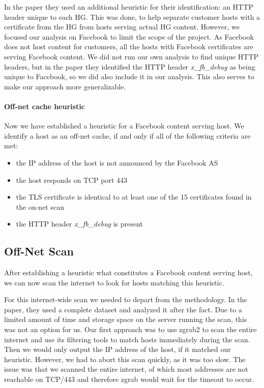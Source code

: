 \documentclass[sigconf,10pt,nonacm]{acmart}
\begin{document}
In the paper they used an additional heuristic for their identification: an HTTP header unique to each HG. This was done, to help separate customer hosts with a certificate from the HG from hosts serving actual HG content. However, we focused our analysis on Facebook to limit the scope of the project. As Facebook does not host content for customers, all the hosts with Facebook certificates are serving Facebook content. We did not run our own analysis to find unique HTTP headers, but in the paper they identified the HTTP header \textit{x\_fb\_debug} as being unique to Facebook, so we did also include it in our analysis. This also serves to make our approach more generalizable.

\paragraph{Off-net cache heuristic}
Now we have established a heuristic for a Facebook content serving host. We identify a host as an off-net cache, if and only if all of the following criteria are met:
\begin{itemize}
    \item the IP address of the host is not announced by the Facebook AS
    \item the host responds on TCP port 443
    \item the TLS certificate is identical to at least one of the 15 certificates found in the on-net scan
    \item the HTTP header \textit{x\_fb\_debug} is present
\end{itemize}

\subsection{Off-Net Scan}

After establishing a heuristic what constitutes a Facebook content serving host, we can now scan the internet to look for hosts matching this heuristic.

For this internet-wide scan we needed to depart from the methodology. In the paper, they used a complete dataset and analyzed it after the fact. Due to a limited amount of time and storage space on the server running the scan, this was not an option for us. Our first approach was to use zgrab2 to scan the entire internet and use its filtering tools to match hosts immediately during the scan. Then we would only output the IP address of the host, if it matched our heuristic. However, we had to abort this scan quickly, as it was too slow. The issue was that we scanned the entire internet, of which most addresses are not reachable on TCP/443 and therefore zgrab would wait for the timeout to occur.
\end{document}

